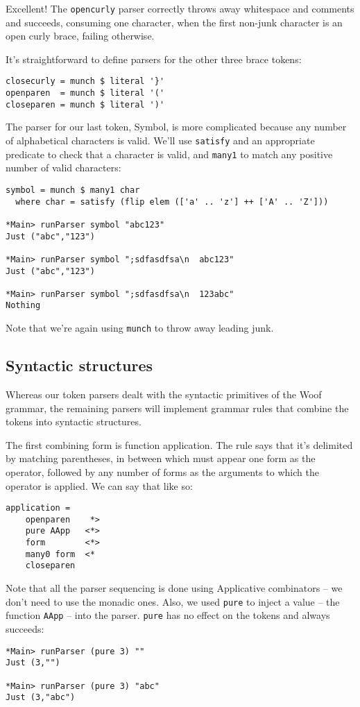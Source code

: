 \documentclass{tmr}
\begin{document}
Excellent!  The \verb+opencurly+ parser correctly throws away whitespace 
and comments and succeeds, consuming one character, when the first non-junk 
character is an open curly brace, failing otherwise.

It's straightforward to define parsers for the other three brace tokens:
\begin{verbatim}
closecurly = munch $ literal '}'
openparen  = munch $ literal '('
closeparen = munch $ literal ')'
\end{verbatim}

The parser for our last token, Symbol, is more complicated because any number of
alphabetical characters is valid.  We'll use \verb+satisfy+ and an appropriate
predicate to check that a character is valid, and \verb+many1+ to 
match any positive number of valid characters:
\begin{verbatim}
symbol = munch $ many1 char
  where char = satisfy (flip elem (['a' .. 'z'] ++ ['A' .. 'Z']))

*Main> runParser symbol "abc123"
Just ("abc","123")

*Main> runParser symbol ";sdfasdfsa\n  abc123"
Just ("abc","123")

*Main> runParser symbol ";sdfasdfsa\n  123abc"
Nothing
\end{verbatim}

Note that we're again using \verb+munch+ to throw away leading junk.

\subsection{Syntactic structures}
Whereas our token parsers dealt with the syntactic primitives of the Woof grammar, 
the remaining parsers will implement grammar rules that combine the tokens
into syntactic structures.

The first combining form is function application.  The rule says that it's delimited
by matching parentheses, in between which must appear one form as the operator, followed
by any number of forms as the arguments to which the operator is applied.  We can
say that like so:
\begin{verbatim}
application =
    openparen    *>
    pure AApp   <*>
    form        <*>
    many0 form  <*
    closeparen
\end{verbatim}

Note that all the parser sequencing is done using Applicative
combinators -- we don't need to use the monadic ones.  Also, we used \verb+pure+ 
to inject a value -- the function \verb+AApp+ -- into the parser.  \verb+pure+ 
has no effect on the tokens and always succeeds:
\begin{verbatim}
*Main> runParser (pure 3) ""
Just (3,"")

*Main> runParser (pure 3) "abc"
Just (3,"abc")
\end{verbatim}
\end{document}
